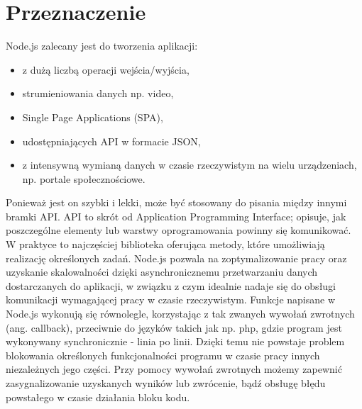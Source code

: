 \documentclass[12pt]{report}
\begin{document}
\section{Przeznaczenie}
Node.js zalecany jest do tworzenia aplikacji: 
\begin{itemize}
\item z dużą liczbą operacji wejścia/wyjścia,
\item strumieniowania danych np. video, 
\item Single Page Applications (SPA),
\item udostępniających API w formacie JSON,
\item z intensywną wymianą danych w czasie rzeczywistym na wielu urządzeniach, np. portale społecznościowe.
\end{itemize} 
Ponieważ jest on szybki i lekki, może być stosowany do pisania między innymi bramki API. 
API to skrót od Application Programming Interface; opisuje, jak poszczególne elementy lub warstwy oprogramowania powinny się komunikować. 
W praktyce to najczęściej biblioteka oferująca metody, które umożliwiają realizację określonych zadań. 
Node.js pozwala na zoptymalizowanie pracy oraz uzyskanie skalowalności dzięki asynchronicznemu przetwarzaniu danych dostarczanych do aplikacji, w związku z czym idealnie nadaje się do obsługi komunikacji wymagającej pracy w czasie rzeczywistym. 
Funkcje napisane w Node.js wykonują się równolegle, korzystając z tak zwanych wywołań zwrotnych (ang. callback), przeciwnie do języków takich jak np. php, gdzie program jest wykonywany synchronicznie - linia po linii. 
Dzięki temu nie powstaje problem blokowania określonych funkcjonalności programu w czasie pracy innych niezależnych jego części. 
Przy pomocy wywołań zwrotnych możemy zapewnić zasygnalizowanie uzyskanych wyników lub zwrócenie, bądź obsługę błędu powstałego w czasie działania bloku kodu.
\end{document}
